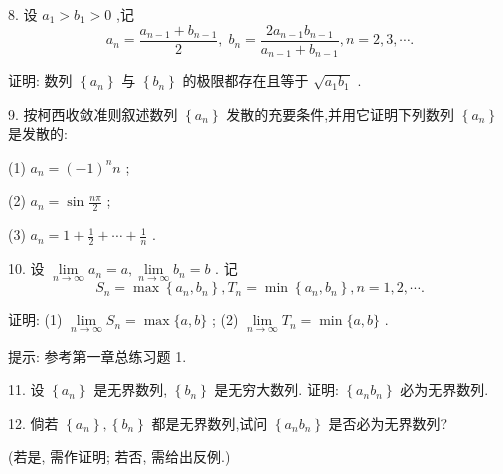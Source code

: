 8. 设 \({a}_{1} > {b}_{1} > 0\) ,记
\[
{a}_{n} = \frac{{a}_{n - 1} + {b}_{n - 1}}{2},\;{b}_{n} = \frac{2{a}_{n - 1}{b}_{n - 1}}{{a}_{n - 1} + {b}_{n - 1}},n = 2,3,\cdots .
\]

证明: 数列 \(\left\{  {a}_{n}\right\}\) 与 \(\left\{  {b}_{n}\right\}\) 的极限都存在且等于 \(\sqrt{{a}_{1}{b}_{1}}\) .

9. 按柯西收敛准则叙述数列 \(\left\{  {a}_{n}\right\}\) 发散的充要条件,并用它证明下列数列 \(\left\{  {a}_{n}\right\}\) 是发散的:

(1) \({a}_{n} = {\left( -1\right) }^{n}n\) ;

(2) \({a}_{n} = \sin \frac{n\pi }{2}\) ;

(3) \({a}_{n} = 1 + \frac{1}{2} + \cdots  + \frac{1}{n}\) .

10. 设 \(\mathop{\lim }\limits_{{n \rightarrow  \infty }}{a}_{n} = a,\mathop{\lim }\limits_{{n \rightarrow  \infty }}{b}_{n} = b\) . 记
\[
{S}_{n} = \max \left\{  {{a}_{n},{b}_{n}}\right\}  ,{T}_{n} = \min \left\{  {{a}_{n},{b}_{n}}\right\}  ,n = 1,2,\cdots .
\]

证明: (1) \(\mathop{\lim }\limits_{{n \rightarrow  \infty }}{S}_{n} = \max \{ a,b\}\) ; (2) \(\mathop{\lim }\limits_{{n \rightarrow  \infty }}{T}_{n} = \min \{ a,b\}\) .

提示: 参考第一章总练习题 1.

11. 设 \(\left\{  {a}_{n}\right\}\) 是无界数列, \(\left\{  {b}_{n}\right\}\) 是无穷大数列. 证明: \(\left\{  {{a}_{n}{b}_{n}}\right\}\) 必为无界数列.

12. 倘若 \(\left\{  {a}_{n}\right\}  ,\left\{  {b}_{n}\right\}\) 都是无界数列,试问 \(\left\{  {{a}_{n}{b}_{n}}\right\}\) 是否必为无界数列?

(若是, 需作证明; 若否, 需给出反例.)

